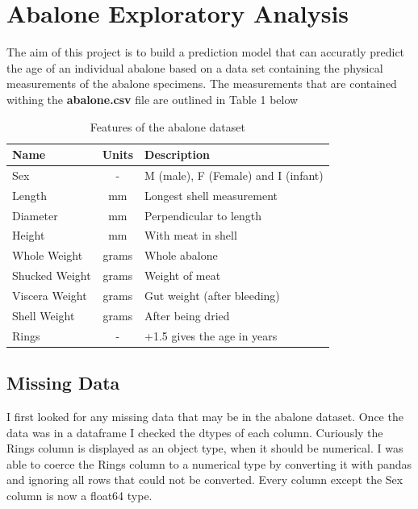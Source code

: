 \section{Abalone Exploratory Analysis}

The aim of this project is to build a prediction model that can accuratly predict the age of an individual abalone based on a data set containing the physical measurements of the abalone specimens. The measurements that are contained withing the \textbf{abalone.csv }file are outlined in Table 1 below

\begin{table}[H]
\centering
\caption{Features of the abalone dataset}
\label{my-label}
\begin{tabular}{|l|c|l|}
\hline
Name           & \multicolumn{1}{l|}{Units} & Description                         \\ \hline
Sex            & -                          & M (male), F (Female) and I (infant) \\ \hline
Length         & mm                         & Longest shell measurement           \\ \hline
Diameter       & mm                         & Perpendicular to length             \\ \hline
Height         & mm                         & With meat in shell                  \\ \hline
Whole Weight   & grams                      & Whole abalone                       \\ \hline
Shucked Weight & grams                      & Weight of meat                      \\ \hline
Viscera Weight & grams                      & Gut weight (after bleeding)         \\ \hline
Shell Weight   & grams                      & After being dried                   \\ \hline
Rings          & -                          & +1.5 gives the age in years         \\ \hline
\end{tabular}
\end{table}

\subsection{Missing Data}

I first looked for any missing data that may be in the abalone dataset. Once the data was in a dataframe I checked the dtypes of each column. Curiously the Rings column is displayed as an object type, when it should be numerical. I was able to coerce the Rings column to a numerical type by converting it with pandas and ignoring all rows that could not be converted. Every column except the Sex column is now a float64 type.
 
